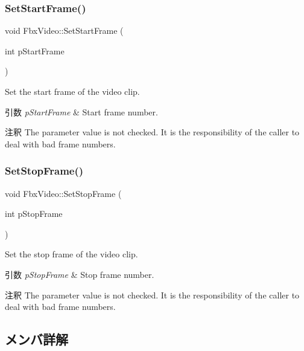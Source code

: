 \subsubsection{\texorpdfstring{Set\+Start\+Frame()}{SetStartFrame()}}
{\footnotesize\ttfamily void Fbx\+Video\+::\+Set\+Start\+Frame (\begin{DoxyParamCaption}\item[{int}]{p\+Start\+Frame }\end{DoxyParamCaption})}

Set the start frame of the video clip. 
\begin{DoxyParams}{引数}
{\em p\+Start\+Frame} & Start frame number. \\
\hline
\end{DoxyParams}
\begin{DoxyRemark}{注釈}
The parameter value is not checked. It is the responsibility of the caller to deal with bad frame numbers. 
\end{DoxyRemark}
\mbox{\label{class_fbx_video_aa7dd98bc975a79daf988c395be2199cd}} 
\subsubsection{\texorpdfstring{Set\+Stop\+Frame()}{SetStopFrame()}}
{\footnotesize\ttfamily void Fbx\+Video\+::\+Set\+Stop\+Frame (\begin{DoxyParamCaption}\item[{int}]{p\+Stop\+Frame }\end{DoxyParamCaption})}

Set the stop frame of the video clip. 
\begin{DoxyParams}{引数}
{\em p\+Stop\+Frame} & Stop frame number. \\
\hline
\end{DoxyParams}
\begin{DoxyRemark}{注釈}
The parameter value is not checked. It is the responsibility of the caller to deal with bad frame numbers. 
\end{DoxyRemark}


\subsection{メンバ詳解}
\mbox{\label{class_fbx_video_a23a5a08b0504da545d812c16a7a0d20a}} 
